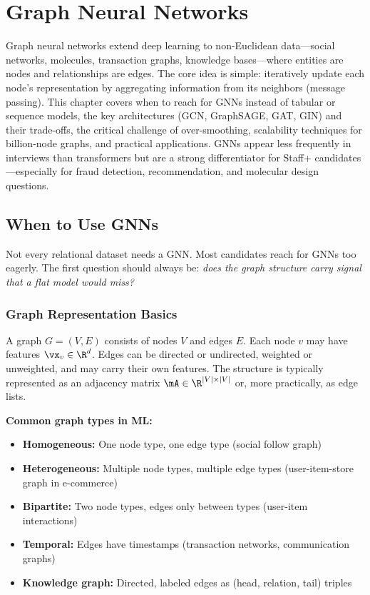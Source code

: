 \chapter{Graph Neural Networks}
\label{chap:graph_neural_networks}

\begin{tldr}
Graph neural networks extend deep learning to non-Euclidean data---social networks, molecules, transaction graphs, knowledge bases---where entities are nodes and relationships are edges. The core idea is simple: iteratively update each node's representation by aggregating information from its neighbors (message passing). This chapter covers when to reach for GNNs instead of tabular or sequence models, the key architectures (GCN, GraphSAGE, GAT, GIN) and their trade-offs, the critical challenge of over-smoothing, scalability techniques for billion-node graphs, and practical applications. GNNs appear less frequently in interviews than transformers but are a strong differentiator for Staff+ candidates---especially for fraud detection, recommendation, and molecular design questions.
\end{tldr}

\section{When to Use GNNs}
\label{sec:when_gnns}

Not every relational dataset needs a GNN. Most candidates reach for GNNs too eagerly. The first question should always be: \textit{does the graph structure carry signal that a flat model would miss?}

\subsection{Graph Representation Basics}

A graph $G = (V, E)$ consists of nodes $V$ and edges $E$. Each node $v$ may have features $\vx_v \in \R^d$. Edges can be directed or undirected, weighted or unweighted, and may carry their own features. The structure is typically represented as an adjacency matrix $\mA \in \R^{|V| \times |V|}$ or, more practically, as edge lists.

\textbf{Common graph types in ML:}
\begin{itemize}
    \item \textbf{Homogeneous:} One node type, one edge type (social follow graph)
    \item \textbf{Heterogeneous:} Multiple node types, multiple edge types (user-item-store graph in e-commerce)
    \item \textbf{Bipartite:} Two node types, edges only between types (user-item interactions)
    \item \textbf{Temporal:} Edges have timestamps (transaction networks, communication graphs)
    \item \textbf{Knowledge graph:} Directed, labeled edges as (head, relation, tail) triples
\end{itemize}

